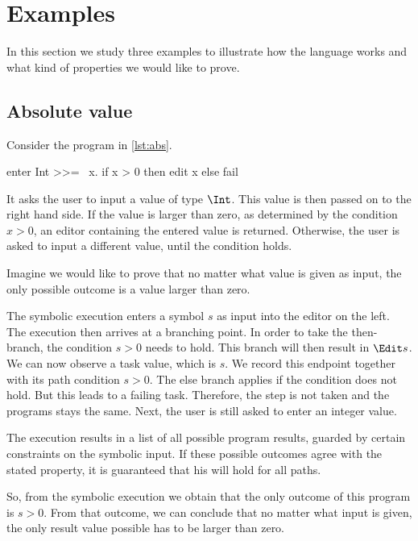 
\section{Examples}
\label{sec:examples}

In this section we study three examples to illustrate how the language works and what kind of properties we would like to prove.



\subsection{Absolute value}

Consider the program in \cref{lst:abs}.

\begin{TASK}[float=h
            ,caption=Absolute value
            ,label=lst:abs
            ]
  enter Int >>= \ x. if x > 0 then edit x else fail
\end{TASK}

It asks the user to input a value of type $\Int$.
This value is then passed on to the right hand side.
If the value is larger than zero, as determined by the condition $x>0$,
an editor containing the entered value is returned.
Otherwise, the user is asked to input a different value, until the condition holds.

Imagine we would like to prove that no matter what value is given as input,
the only possible outcome is a value larger than zero.

The symbolic execution enters a symbol $s$ as input into the editor on the left.
The execution then arrives at a branching point.
In order to take the then-branch, the condition $s > 0$ needs to hold.
This branch will then result in $\Edit s$.
We can now observe a task value, which is $s$.
We record this endpoint together with its path condition $s > 0$.
The else branch applies if the condition does not hold.
But this leads to a failing task.
Therefore, the step is not taken and the programs stays the same.
Next, the user is still asked to enter an integer value.

The execution results in a list of all possible program results,
guarded by certain constraints on the symbolic input.
If these possible outcomes agree with the stated property,
it is guaranteed that his will hold for all paths.

So, from the symbolic execution we obtain that the only outcome of this program is $s > 0$.
From that outcome, we can conclude that no matter what input is given, the only result value possible has to be larger than zero.




